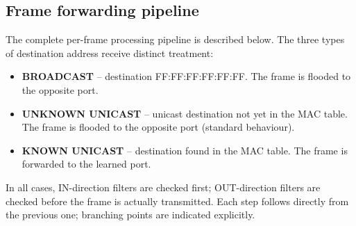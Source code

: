 \documentclass[12pt,a4paper]{article}
\begin{document}
\subsection{Frame forwarding pipeline}

The complete per-frame processing pipeline is described below.
The three types of destination address receive distinct treatment:

\begin{itemize}[noitemsep]
  \item \textbf{BROADCAST} -- destination FF:FF:FF:FF:FF:FF.  The frame is
    flooded to the opposite port.
  \item \textbf{UNKNOWN UNICAST} -- unicast destination not yet in the MAC
    table.  The frame is flooded to the opposite port (standard behaviour).
  \item \textbf{KNOWN UNICAST} -- destination found in the MAC table.  The
    frame is forwarded to the learned port.
\end{itemize}

In all cases, IN-direction filters are checked first; OUT-direction filters are
checked before the frame is actually transmitted.
Each step follows directly from the previous one; branching points are
indicated explicitly.
\end{document}
